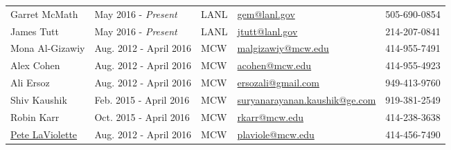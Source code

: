 
\begin{center}
\begin{minipage}{\textwidth}
\begin{tabular}{lllll}

{Garret McMath} \label{garret_mcmath}& {May 2016 - \emph{Present}} & {LANL} &  \href{mailto:gem@lanl.gov}{gem@lanl.gov} & 505-690-0854 \\ %

{James Tutt} \label{james_tutt}& {May 2016 - \emph{Present}} & {LANL} &  \href{mailto:jtutt@lanl.gov}{jtutt@lanl.gov} & 214-207-0841 \\ %

{Mona Al-Gizawiy} \label{mona_algiazwiy}& {Aug. 2012 - April 2016} & {MCW} &  \href{mailto:malgizawiy@mcw.edu}{malgizawiy@mcw.edu} & 414-955-7491 \\ %

{Alex Cohen} \label{alex_cohen}& {Aug. 2012 - April 2016} & {MCW} &  \href{mailto:acohen@mcw.edu}{acohen@mcw.edu} & 414-955-4923 \\ %

{Ali Ersoz} \label{ali_ersoz}& {Aug. 2012 - April 2016} & {MCW} &  \href{mailto:ersozali@gmail.com}{ersozali@gmail.com} & 949-413-9760 \\ %


{Shiv Kaushik} \label{robin_karr}& {Feb. 2015 - April 2016} & {MCW} &  \href{mailto:suryanarayanan.kaushik@ge.com}{suryanarayanan.kaushik@ge.com} & 919-381-2549 \\ %

{Robin Karr} \label{robin_karr}& {Oct. 2015 - April 2016} & {MCW} &  \href{mailto:rkarr@mcw.edu}{rkarr@mcw.edu} & 414-238-3638 \\ %

\href{http://www.mcw.edu/radiology/faculty/PeterLaViolette.htm}{Pete LaViolette} \label{pete_laviolette}& {Aug. 2012 - April 2016} & {MCW} &  \href{mailto:plaviole@mcw.edu}{plaviole@mcw.edu} & 414-456-7490 \\ %


\end{tabular}
\end{minipage}
\end{center}
